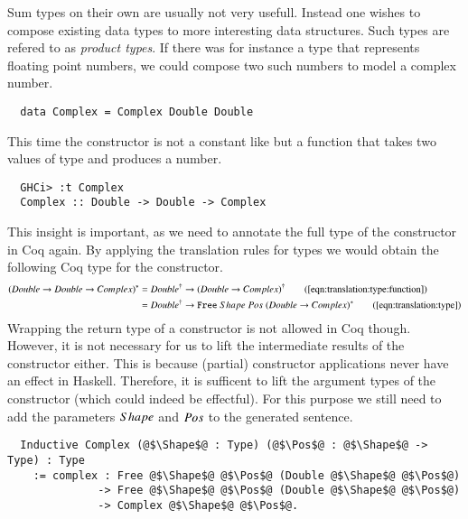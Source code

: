 Sum types on their own are usually not very usefull.
Instead one wishes to compose existing data types to more interesting data structures.
Such types are refered to as \textit{product types}.
If there was for instance a type  that represents floating point numbers, we could compose two such numbers to model a complex number.
\begin{verbatim}
  data Complex = Complex Double Double
\end{verbatim}
This time the constructor  is not a constant like  but a function that takes two values of type  and produces a  number.
\begin{verbatim}
  GHCi> :t Complex
  Complex :: Double -> Double -> Complex
\end{verbatim}
This insight is important, as we need to annotate the full type of the constructor in Coq again.
By applying the translation rules for types we would obtain the following Coq type for the constructor.
\begin{align*}
  \toCoqT{(Double \rightarrow Double \rightarrow Complex)}
    &= \toCoq{Double} \rightarrow \toCoq{(Double \rightarrow Complex)}
    \tag{\autoref{eqn:translation:type:function}}
    \\
    &= \toCoq{Double} \rightarrow \Free{\toCoqT{(Double \rightarrow Complex)}}
    \tag{\autoref{eqn:translation:type}}
\end{align*}
Wrapping the return type of a constructor is not allowed in Coq though.
However, it is not necessary for us to lift the intermediate results of the constructor either.
This is because (partial) constructor applications never have an effect in Haskell.
Therefore, it is sufficent to lift the argument types of the constructor (which could indeed be effectful).
For this purpose we still need to add the parameters $Shape$ and $Pos$ to the generated sentence.
\begin{verbatim}
  Inductive Complex (@$\Shape$@ : Type) (@$\Pos$@ : @$\Shape$@ -> Type) : Type
    := complex : Free @$\Shape$@ @$\Pos$@ (Double @$\Shape$@ @$\Pos$@)
              -> Free @$\Shape$@ @$\Pos$@ (Double @$\Shape$@ @$\Pos$@)
              -> Complex @$\Shape$@ @$\Pos$@.
\end{verbatim}

